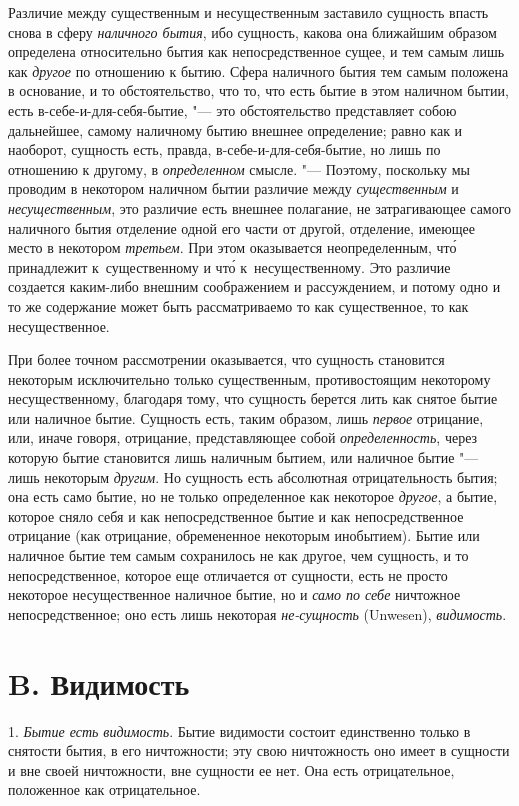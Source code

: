 Различие между существенным и несущественным заставило сущность впасть снова
в сферу {\em наличного бытия}, ибо сущность, какова она
ближайшим образом определена относительно бытия как непосредственное сущее,
и тем самым лишь как {\em другое} по отношению к бытию.
Сфера наличного бытия тем самым положена в основание, и то обстоятельство,
что то, что есть бытие в этом наличном бытии, есть в-себе-и-для-себя-бытие,
"--- это обстоятельство представляет собою дальнейшее, самому наличному бытию
внешнее определение; равно как и наоборот, сущность есть, правда,
в-себе-и-для-себя-бытие, но лишь по отношению к другому, в
{\em определенном} смысле. "--- Поэтому, поскольку мы
проводим в некотором наличном бытии различие между
{\em существенным} и
{\em несущественным}, это различие есть внешнее
полагание, не затрагивающее самого наличного бытия отделение одной его
части от другой, отделение, имеющее место в некотором
{\em третьем}. При этом оказывается неопределенным, чт\'{о} принадлежит
к~существенному и чт\'{о} к~несущественному. Это различие создается
каким-либо внешним соображением и рассуждением, и потому одно и то же
содержание может быть рассматриваемо то как существенное, то как
несущественное.

При более точном рассмотрении оказывается, что сущность становится некоторым
исключительно только существенным, противостоящим некоторому
несущественному, благодаря тому, что сущность берется лить как снятое бытие
или наличное бытие. Сущность есть, таким образом, лишь
{\em первое} отрицание, или, иначе говоря, отрицание,
представляющее собой {\em определенность}, через
которую бытие становится лишь наличным бытием, или наличное бытие "--- лишь
некоторым {\em другим}. Но сущность есть абсолютная
отрицательность бытия; она есть само бытие, но не только определенное как
некоторое {\em другое}, а бытие, которое сняло себя и
как непосредственное бытие и как непосредственное отрицание (как отрицание,
обремененное некоторым инобытием). Бытие или наличное бытие тем самым
сохранилось не как другое, чем сущность, и то непосредственное, которое еще
отличается от сущности, есть не просто некоторое несущественное наличное
бытие, но и {\em само по себе} ничтожное
непосредственное; оно есть лишь некоторая
{\em не-сущность} (Unwesen),
{\em видимость}.

\section[B. Видимость]{B. Видимость}
1. {\em Бытие есть
видимость}. Бытие видимости состоит единственно только в снятости бытия, в
его ничтожности; эту свою ничтожность оно имеет в сущности и вне своей
ничтожности, вне сущности ее нет. Она есть отрицательное, положенное как
отрицательное.

